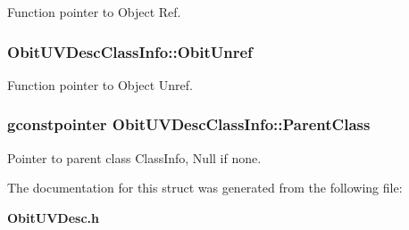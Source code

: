 Function pointer to Object Ref. 

\subsubsection{ {\bf Obit\-UVDesc\-Class\-Info::Obit\-Unref}}\label{structObitUVDescClassInfo_o11}


Function pointer to Object Unref. 

\subsubsection{\setlength{\rightskip}{0pt plus 5cm}gconstpointer {\bf Obit\-UVDesc\-Class\-Info::Parent\-Class}}\label{structObitUVDescClassInfo_o3}


Pointer to parent class Class\-Info, Null if none. 



The documentation for this struct was generated from the following file:\begin{CompactItemize}
\item 
{\bf Obit\-UVDesc.h}\end{CompactItemize}
